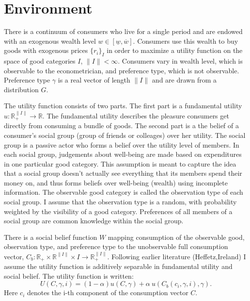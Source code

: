 \documentclass{article}
\begin{document}
\section{Environment}
There is a continuum of consumers who live for a single period and are endowed with an exogenous wealth level $w \in \left[ \underline{w},\overline{w} \right]$.
Consumers use this wealth to buy goods with exogenous prices $\{r_i\}_I$ in order to maximize a utility function on the space of good categories $I$, $\|I\|<\infty$. 
Consumers vary in wealth level, which is observable to the econometrician, and preference type, which is not observable.
Preference type $\gamma$ is a real vector of length $\|I\|$ and are drawn from a distribution $G$.

The utility function consists of two parts.  The first part is a fundamental utility $u:\mathbb{R}_+^{\|I\|}\rightarrow\mathbb{R}$.
The fundamental utility describes the pleasure consumers get directly from consuming a bundle of goods.
The second part is a the belief of a consumer's social group (group of friends or colleages) over her utility.
The social group is a passive actor who forms a belief over the utility level of members.  
In each social group, judgements about well-being are made based on expenditures in one particular good category.
This assumption is meant to capture the idea that a social group doesn't actually see everything that its members spend their money on, and thus forms beliefs over well-being (wealth) using incomplete information.
The observable good category is called the observation type of each social group.
I assume that the observation type is a random, with probability weighted by the visibility of a good category.
Preferences of all members of a social group are common knowledge within the social group.

There is a social belief function $W$ mapping consumption of the observable good, observation type, and preference type to the unobservable full consumption vector, $C_b: \mathbb{R}_+\times\mathbb{R}^{\|I\|}\times I\rightarrow \mathbb{R}_+^{\|I\|}$.
Following earlier literature (Heffetz,Ireland) I assume the utility function is additively separable in fundamental utility and social belief.
The utility function is written:
\[U(C,\gamma,i) = (1-\alpha) u(C,\gamma) + \alpha\  u(C_b(c_i,\gamma,i),\gamma).\]
Here $c_i$ denotes the i-th component of the consumption vector $C$.
\end{document}
